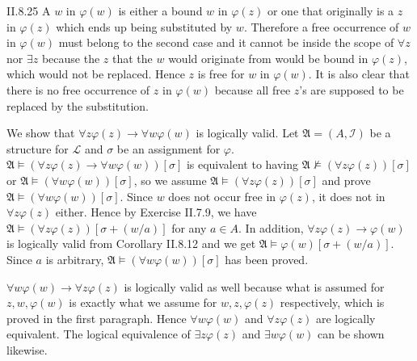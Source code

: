 \documentclass[12pt]{article}
\begin{document}
\begin{customthm}{II.8.25}
  A $w$ in $\varphi(w)$ is either a bound $w$ in $\varphi(z)$ or one that originally is a $z$ in $\varphi(z)$ which ends up being substituted by $w$. Therefore a free occurrence of $w$ in $\varphi(w)$ must belong to the second case and it cannot be inside the scope of $\forall z$ nor $\exists z$ because the $z$ that the $w$ would originate from would be bound in $\varphi(z)$, which would not be replaced. Hence $z$ is free for $w$ in $\varphi(w)$. It is also clear that there is no free occurrence of $z$ in $\varphi(w)$ because all free $z$'s are supposed to be replaced by the substitution.

  We show that $\forall z\varphi(z)\rightarrow\forall w\varphi(w)$ is logically valid. Let $\mathfrak{A}=(A,\mathcal{I})$ be a structure for $\mathcal{L}$ and $\sigma$ be an assignment for $\varphi$. $\mathfrak{A}\models(\forall z\varphi(z)\rightarrow\forall w\varphi(w))[\sigma]$ is equivalent to having $\mathfrak{A}\not\models(\forall z\varphi(z))[\sigma]$ or $\mathfrak{A}\models(\forall w\varphi(w))[\sigma]$, so we assume $\mathfrak{A}\models(\forall z\varphi(z))[\sigma]$ and prove $\mathfrak{A}\models(\forall w\varphi(w))[\sigma]$. Since $w$ does not occur free in $\varphi(z)$, it does not in $\forall z\varphi(z)$ either. Hence by Exercise II.7.9, we have $\mathfrak{A}\models(\forall z\varphi(z))[\sigma+(w/a)]$ for any $a\in A$. In addition, $\forall z\varphi(z)\rightarrow\varphi(w)$ is logically valid from Corollary II.8.12 and we get $\mathfrak{A}\models\varphi(w)[\sigma+(w/a)]$. Since $a$ is arbitrary, $\mathfrak{A}\models(\forall w\varphi(w))[\sigma]$ has been proved.

  $\forall w\varphi(w)\rightarrow\forall z\varphi(z)$ is logically valid as well because what is assumed for $z,w,\varphi(w)$ is exactly what we assume for $w,z,\varphi(z)$ respectively, which is proved in the first paragraph. Hence $\forall w\varphi(w)$ and $\forall z\varphi(z)$ are logically equivalent. The logical equivalence of $\exists z\varphi(z)$ and $\exists w\varphi(w)$ can be shown likewise.
\end{customthm}
\end{document}
